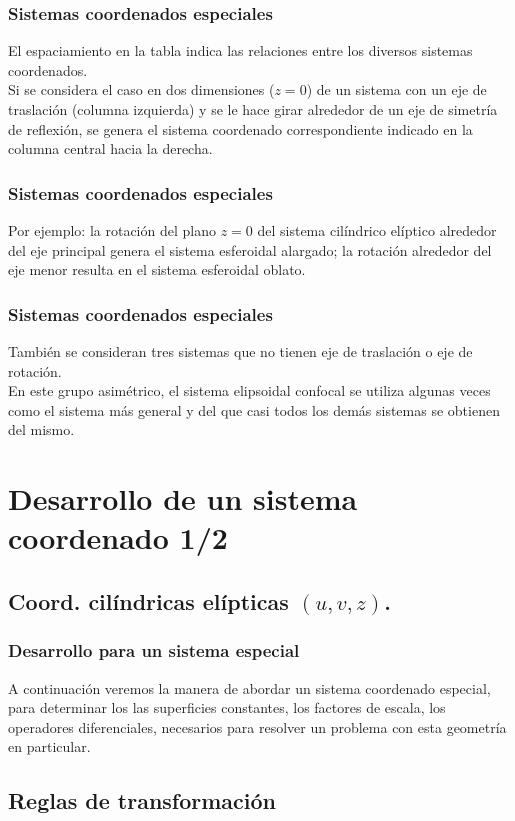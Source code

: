 \documentclass[12pt]{beamer}
\begin{document}
\begin{frame}
\frametitle{Sistemas coordenados especiales}
El espaciamiento en la tabla indica las relaciones entre los diversos sistemas coordenados.
\\
\bigskip
\pause
Si se considera el caso en dos dimensiones ($z = 0$) de un sistema con un eje de traslación (columna izquierda) y se le hace girar alrededor de un eje de simetría de reflexión, se genera el sistema coordenado correspondiente indicado en la columna central hacia la derecha.
\end{frame}
\begin{frame}
\frametitle{Sistemas coordenados especiales}
Por ejemplo: la rotación del plano $z = 0$ del sistema cilíndrico elíptico alrededor del eje principal genera el sistema esferoidal alargado; la rotación alrededor del eje menor resulta en el sistema esferoidal oblato.
\end{frame}
\begin{frame}
\frametitle{Sistemas coordenados especiales}
También se consideran tres sistemas que no tienen eje de traslación o eje de rotación.
\\
\bigskip
\pause
En este grupo asimétrico, el sistema elipsoidal confocal se utiliza algunas veces como el sistema más general y del que casi todos los demás sistemas se obtienen del mismo.
\end{frame}

\section{Desarrollo de un sistema coordenado 1/2}
\subsection{Coord. cilíndricas elípticas \texorpdfstring{$(u, v, z)$}{(u, v, z)}.}

\begin{frame}
\frametitle{Desarrollo para un sistema especial}
A continuación veremos la manera de abordar un sistema coordenado especial, para determinar los las superficies constantes, los factores de escala, los operadores diferenciales, necesarios para resolver un problema con esta geometría en particular.
\end{frame}

\subsection{Reglas de transformación}
\end{document}
